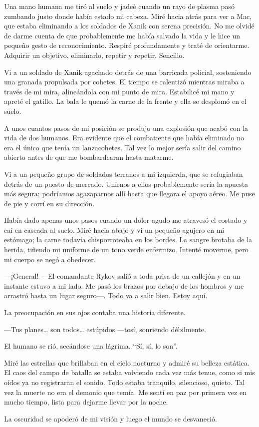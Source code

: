 Una mano humana me tiró al suelo y jadeé cuando un rayo de plasma pasó zumbando justo donde había estado mi cabeza. Miré hacia atrás para ver a Mac, que estaba eliminando a los soldados de Xanik con serena precisión. No me olvidé de darme cuenta de que probablemente me había salvado la vida y le hice un pequeño gesto de reconocimiento. Respiré profundamente y traté de orientarme. Adquirir un objetivo, eliminarlo, repetir y repetir. Sencillo.

Vi a un soldado de Xanik agachado detrás de una barricada policial, sosteniendo una granada propulsada por cohetes. El tiempo se ralentizó mientras miraba a través de mi mira, alineándola con mi punto de mira. Estabilicé mi mano y apreté el gatillo. La bala le quemó la carne de la frente y ella se desplomó en el suelo.

A unos cuantos pasos de mi posición se produjo una explosión que acabó con la vida de dos humanos. Era evidente que el combatiente que había eliminado no era el único que tenía un lanzacohetes. Tal vez lo mejor sería salir del camino abierto antes de que me bombardearan hasta matarme.

Vi a un pequeño grupo de soldados terranos a mi izquierda, que se refugiaban detrás de un puesto de mercado. Unirnos a ellos probablemente sería la apuesta más segura; podríamos agazaparnos allí hasta que llegara el apoyo aéreo. Me puse de pie y corrí en su dirección.

Había dado apenas unos pasos cuando un dolor agudo me atravesó el costado y caí en cascada al suelo. Miré hacia abajo y vi un pequeño agujero en mi estómago; la carne todavía chisporroteaba en los bordes. La sangre brotaba de la herida, tiñendo mi uniforme de un tono verde enfermizo. Intenté moverme, pero mi cuerpo se negó a obedecer.

—¡General! —El comandante Rykov salió a toda prisa de un callejón y en un instante estuvo a mi lado. Me pasó los brazos por debajo de los hombros y me arrastró hasta un lugar seguro—. Todo va a salir bien. Estoy aquí.

La preocupación en sus ojos contaba una historia diferente.

—Tus planes… son todos… estúpidos —tosí, sonriendo débilmente.

El humano se rió, secándose una lágrima. ``Sí, sí, lo son''.

Miré las estrellas que brillaban en el cielo nocturno y admiré su belleza estática. El caos del campo de batalla se estaba volviendo cada vez más tenue, como si mis oídos ya no registraran el sonido. Todo estaba tranquilo, silencioso, quieto. Tal vez la muerte no era el demonio que temía. Me sentí en paz por primera vez en mucho tiempo, lista para dejarme llevar por la noche.

La oscuridad se apoderó de mi visión y luego el mundo se desvaneció.
